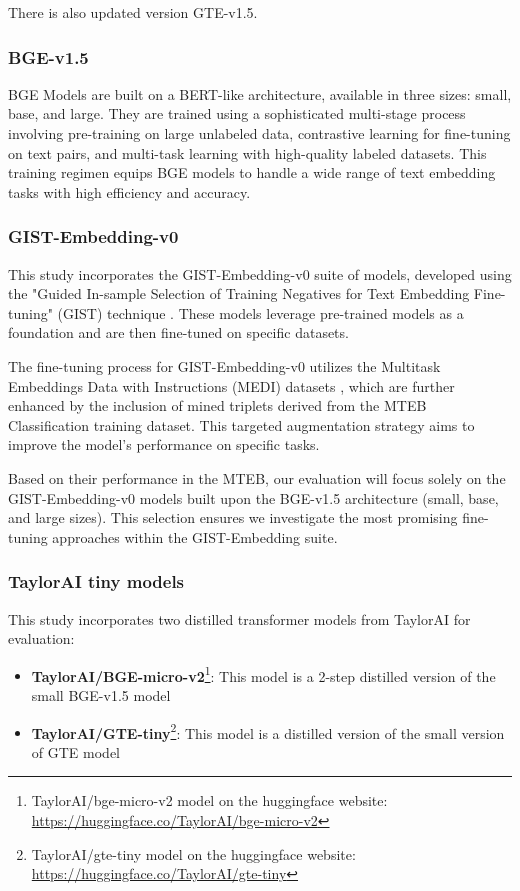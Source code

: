 There is also updated version \ac{GTE}-v1.5.

\subsubsection{\ac{BGE}-v1.5} \label{model:bge}
\ac{BGE} Models \cite{xiao2024cpack} are built on a \ac{BERT}-like architecture, available in three sizes: small, base, and large.
They are trained using a sophisticated multi-stage process involving pre-training on large unlabeled data, contrastive learning for fine-tuning on text pairs, and multi-task learning with high-quality labeled datasets.
This training regimen equips \ac{BGE} models to handle a wide range of text embedding tasks with high efficiency and accuracy.

\subsubsection{GIST-Embedding-v0}
This study incorporates the GIST-Embedding-v0 suite of models, developed using the "Guided In-sample Selection of Training Negatives for Text Embedding Fine-tuning" (GIST) technique \cite{solatorio2024gistembed}.
These models leverage pre-trained models as a foundation and are then fine-tuned on specific datasets.

The fine-tuning process for GIST-Embedding-v0 utilizes the Multitask Embeddings Data with Instructions (MEDI) datasets \cite{su2023embedder}, which are further enhanced by the inclusion of mined triplets derived from the \ac{MTEB} Classification training dataset.
This targeted augmentation strategy aims to improve the model's performance on specific tasks.

Based on their performance in the \ac{MTEB}, our evaluation will focus solely on the GIST-Embedding-v0 models built upon the \ac{BGE}-v1.5 architecture (small, base, and large sizes).
This selection ensures we investigate the most promising fine-tuning approaches within the GIST-Embedding suite.

\subsubsection{TaylorAI tiny models} \label{model:taylorai}
This study incorporates two distilled transformer models from TaylorAI for evaluation:

\begin{itemize}
  \item \textbf{TaylorAI/BGE-micro-v2}\footnote{TaylorAI/bge-micro-v2 model on the huggingface website: \url{https://huggingface.co/TaylorAI/bge-micro-v2}}:
    This model is a 2-step distilled version of the small \ac{BGE}-v1.5 model
  \item \textbf{TaylorAI/GTE-tiny}\footnote{TaylorAI/gte-tiny model on the huggingface website: \url{https://huggingface.co/TaylorAI/gte-tiny}}:
    This model is a distilled version of the small version of \ac{GTE} model
\end{itemize}

